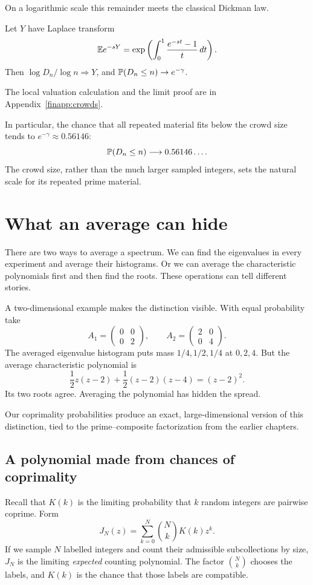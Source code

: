 On a logarithmic scale this remainder meets the classical Dickman law.
\begin{corollary}\label{fin:dickman}
Let $Y$ have Laplace transform
\[
 \mathbb E e^{-sY}=\exp\left(\int_0^1\frac{e^{-st}-1}{t}\,dt\right).
\]
Then $\log D_n/\log n\Longrightarrow Y$, and
$\mathbb P(D_n\le n)\to e^{-\gamma}$.
\end{corollary}
The local valuation calculation and the limit proof are in
Appendix~\ref{finapp:crowds}.

In particular, the chance that all repeated material fits below the
crowd size tends to $e^{-\gamma}\approx0.56146$:
\[
 \mathbb P(D_n\le n)\longrightarrow0.56146\ldots.
\]
The crowd size, rather than the much larger sampled integers, sets
the natural scale for its repeated prime material.

\section{What an average can hide}\label{fin:matrices}
There are two ways to average a spectrum.
We can find the eigenvalues in every experiment and average their
histograms.  Or we can average the characteristic polynomials first
and then find the roots.  These operations can tell different stories.

A two-dimensional example makes the distinction visible.
With equal probability take
\[
 A_1=\begin{pmatrix}0&0\\0&2\end{pmatrix},
 \qquad
 A_2=\begin{pmatrix}2&0\\0&4\end{pmatrix}.
\]
The averaged eigenvalue histogram puts mass $1/4,1/2,1/4$ at
$0,2,4$.  But the average characteristic polynomial is
\[
 \frac12z(z-2)+\frac12(z-2)(z-4)=(z-2)^2.
\]
Its two roots agree.  Averaging the polynomial has hidden the spread.

Our coprimality probabilities produce an exact, large-dimensional
version of this distinction, tied to the prime--composite
factorization from the earlier chapters.

\subsection{A polynomial made from chances of coprimality}
Recall that $K(k)$ is the limiting probability that $k$ random
integers are pairwise coprime.  Form
\[
 J_N(z)=\sum_{k=0}^N\binom Nk K(k)z^k.
\]
If we sample $N$ labelled integers and count their admissible
subcollections by size, $J_N$ is the limiting \emph{expected} counting
polynomial.  The factor $\binom Nk$ chooses the labels, and $K(k)$
is the chance that those labels are compatible.

